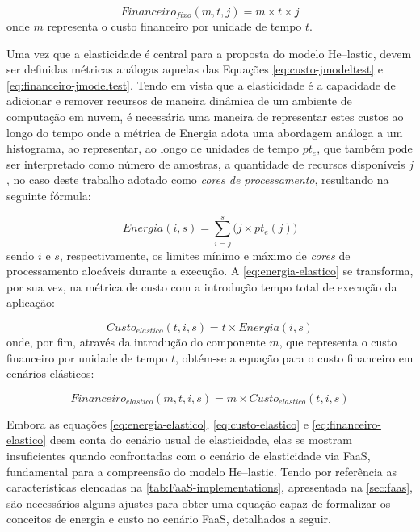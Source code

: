 \documentclass[english,brazilian]{UNISINOSmonografia} %
\begin{document}
\begin{equation}
\label{eq:financeiro-jmodeltest}
Financeiro_{fixo}(m,t,j) = m \times t \times j
\end{equation}
onde $ m $ representa o custo financeiro por unidade de tempo $ t $.



Uma vez que a elasticidade é central para a proposta do modelo \textsf{He}--lastic, devem ser definidas métricas análogas aquelas das Equações \ref{eq:custo-jmodeltest} e \ref{eq:financeiro-jmodeltest}.
Tendo em vista que a elasticidade é a capacidade de adicionar e remover recursos de maneira dinâmica de um ambiente de computação em nuvem, é necessária uma maneira de representar estes custos ao longo do tempo onde a métrica de Energia adota uma abordagem análoga a um histograma, ao representar, ao longo de unidades de tempo $ pt_e $, que também pode ser interpretado como número de amostras, a quantidade de recursos disponíveis $ j $, no caso deste trabalho adotado como \textit{cores de processamento}, resultando na seguinte fórmula:

\begin{equation}
\label{eq:energia-elastico}
Energia(i,s) = \sum_{i=j}^{s} \big( j \times pt_e(j) \big) 
\end{equation}
sendo $ i $ e $ s $, respectivamente, os limites mínimo e máximo de \textit{cores} de processamento alocáveis durante a execução.
A \autoref{eq:energia-elastico} se transforma, por sua vez, na métrica de custo com a introdução tempo total de execução da aplicação:

\begin{equation}
\label{eq:custo-elastico}
Custo_{elastico}(t,i,s) = t \times Energia(i,s)
\end{equation}
onde, por fim, através da introdução do componente $ m $, que representa o custo financeiro por unidade de tempo $ t $, obtém-se a equação para o custo financeiro em cenários elásticos:

\begin{equation}
\label{eq:financeiro-elastico}
Financeiro_{elastico}(m,t,i,s) = m \times Custo_{elastico}(t,i,s)
\end{equation}



Embora as equações \ref{eq:energia-elastico}, \ref{eq:custo-elastico} e \ref{eq:financeiro-elastico} deem conta do cenário usual de elasticidade, elas se mostram insuficientes quando confrontadas com o cenário de elasticidade via FaaS, fundamental para a compreensão do modelo \textsf{He}--lastic.
Tendo por referência as características elencadas na \autoref{tab:FaaS-implementations}, apresentada na \autoref{sec:faas}, são necessários alguns ajustes para obter uma equação capaz de formalizar os conceitos de energia e custo no cenário FaaS, detalhados a seguir.
\end{document}
